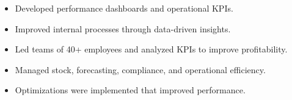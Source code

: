 \documentclass[10pt,a4paper,ragged2e]{altacv}
\begin{document}
\divider



\begin{itemize}
\item Developed performance dashboards and operational KPIs.
\item Improved internal processes through data-driven insights.
\end{itemize}

\divider

\begin{itemize}
\item Led teams of 40+ employees and analyzed KPIs to improve profitability.
\item Managed stock, forecasting, compliance, and operational efficiency.
\item Optimizations were implemented that improved performance.
\end{itemize}
\end{document}
